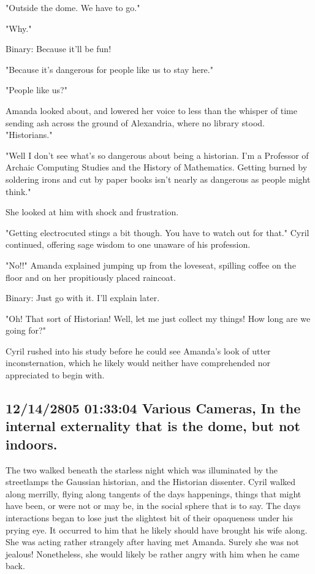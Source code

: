 \documentclass[12pt]{article}
\begin{document}
"Outside the dome. We have to go."

"Why."

Binary: Because it'll be fun!

"Because it's dangerous for people like us to stay here."

"People like us?"

Amanda looked about, and lowered her voice to less than the whisper of time sending ash across the ground of Alexandria, where no library stood. "Historians."

"Well I don't see what's so dangerous about being a historian. I'm a Professor of Archaic Computing Studies and the History of Mathematics. Getting burned by soldering irons and cut by paper books isn't nearly as dangerous as people might think."

She looked at him with shock and frustration.

"Getting electrocuted stings a bit though. You have to watch out for that." Cyril continued, offering sage wisdom to one unaware of his profession.

"No!!" Amanda explained jumping up from the loveseat, spilling coffee on the floor and on her propitiously placed raincoat.

Binary: Just go with it. I'll explain later.

"Oh! That sort of Historian! Well, let me just collect my things! How long are we going for?"

Cyril rushed into his study before he could see Amanda's look of utter inconsternation, which he likely would neither have comprehended nor appreciated to begin with.

\subsection*{12/14/2805 01:33:04 Various Cameras, In the internal externality that is the dome, but not indoors.}
\label{sec:orgd392d89}

The two walked beneath the starless night which was illuminated by the streetlamps the Gaussian historian, and the Historian dissenter. Cyril walked along merrilly, flying along tangents of the days happenings, things that might have been, or were not or may be, in the social sphere that is to say. The days interactions began to lose just the slightest bit of their opaqueness under his prying eye. It occurred to him that he likely should have brought his wife along. She was acting rather strangely after having met Amanda. Surely she was not jealous! Nonetheless, she would likely be rather angry with him when he came back.
\end{document}
